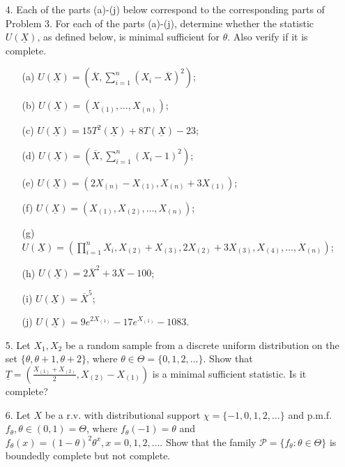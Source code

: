 \documentclass[11pt]{article}
\begin{document}
\begin{enumerate}
    \item [4.] Each of the parts (a)-(j) below correspond to the corresponding parts of Problem 3. For each of the parts (a)-(j), determine whether the statistic $U(\underline{X})$, as defined below, is minimal sufficient for $\theta$. Also verify if it is complete.
    \begin{enumerate}
        \item[(a)] $U(\underline{X}) = \left(\overline{X}, \sum_{i=1}^{n}(X_i - \overline{X})^2\right)$;
        \item[(b)] $U(\underline{X}) = (X_{(1)}, \dots, X_{(n)})$;
        \item[(c)] $U(\underline{X}) = 15T^2(\underline{X}) + 8T(\underline{X}) - 23$;
        \item[(d)] $U(\underline{X}) = \left(\overline{X}, \sum_{i=1}^{n}(X_i - 1)^2\right)$;
        \item[(e)] $U(\underline{X}) = (2X_{(n)} - X_{(1)}, X_{(n)} + 3X_{(1)})$;
        \item[(f)] $U(\underline{X}) = (X_{(1)}, X_{(2)}, \dots, X_{(n)})$;
        \item[(g)] $U(\underline{X}) = \left(\prod_{i=1}^{n} X_i, X_{(2)} + X_{(3)}, 2X_{(2)} + 3X_{(3)}, X_{(4)}, \dots, X_{(n)}\right)$;
        \item[(h)] $U(\underline{X}) = 2\overline{X}^2 + 3\overline{X} - 100$;
        \item[(i)] $U(\underline{X}) = \overline{X}^5$;
        \item[(j)] $U(\underline{X}) = 9e^{2X_{(1)}} - 17e^{X_{(1)}} - 1083$.
    \end{enumerate}
\end{enumerate}

\begin{enumerate}
    \item [5.] Let $X_1, X_2$ be a random sample from a discrete uniform distribution on the set $\{\theta, \theta+1, \theta+2\}$, where $\theta \in \Theta = \{0, 1, 2, \dots\}$. Show that $\underline{T} = \left( \frac{X_{(1)}+X_{(2)}}{2}, X_{(2)} - X_{(1)} \right)$ is a minimal sufficient statistic. Is it complete?
\end{enumerate}

\begin{enumerate}
    \item [6.] Let $X$ be a r.v. with distributional support $\chi = \{-1, 0, 1, 2, \dots\}$ and p.m.f. $f_\theta, \theta \in (0, 1) = \Theta$, where $f_\theta(-1) = \theta$ and $f_\theta(x) = (1 - \theta)^2 \theta^x, x = 0, 1, 2, \dots$. Show that the family $\mathcal{P} = \{f_\theta : \theta \in \Theta\}$ is boundedly complete but not complete.
\end{enumerate}
\end{document}
